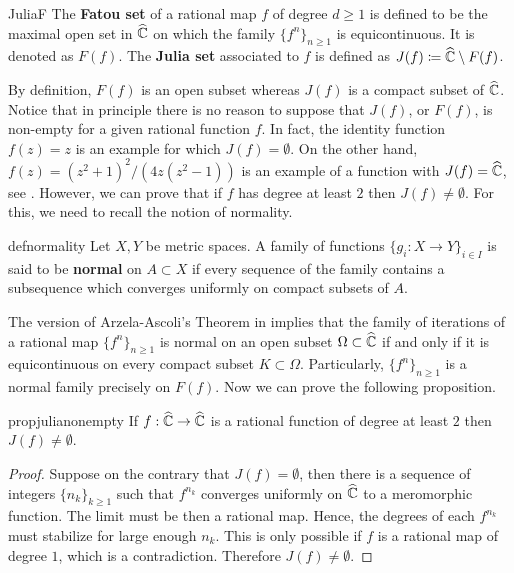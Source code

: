 \begin{mydef}{}{JuliaF}
The {\bf Fatou set} of a rational map $f$ of degree $d\geq 1$ is defined to be the maximal open set in $\widehat{\mathbb{C}}$ on which the family $\{f^n\}_{n\geq 1}$ is equicontinuous. It is denoted as $F(f)$.  The {\bf Julia set} associated to $f$ is defined as $J(f) \coloneqq \widehat{\mathbb{C}}\setminus F(f)$. 
\end{mydef}

By definition, $F(f)$ is an open subset whereas $J(f)$ is a compact subset of $\widehat{\mathbb{C}}$. Notice that in principle there is no reason to suppose that $J(f)$, or $F(f)$, is non-empty for a given rational  function $f$. In fact, the identity function $f(z)=z$ is an example for which $J(f)=\emptyset$. On the other hand, $f(z) = (z^2+1)^2/(4z(z^2-1))$ is an example of a function with $J(f) = \widehat{\mathbb{C}}$, see \cite[Section 4.3]{beardon}. However, we can prove that if $f$ has degree at least $2$ then $J(f)\neq \emptyset$. For this, we need to recall the notion of normality.

\begin{mydef}{}{defnormality}
Let $X,Y$ be metric spaces. A family of functions $\{g_i:X\to Y \}_{i\in I}$ is said to be {\bf normal} on $A\subset X$ if every sequence of the family contains a subsequence which converges uniformly on compact subsets of $A$.
\end{mydef}

The version of Arzela-Ascoli's Theorem in \cite[Theorem 14, Section 5.3]{ahlfors} implies that the family of iterations of a rational map $\{f^n\}_{n\geq 1}$ is normal on an open subset $\Omega\subset \widehat{\mathbb{C}}$ if and only if it is equicontinuous on every compact subset $K\subset \Omega$. Particularly, $\{f^n\}_{n\geq 1}$ is a normal family precisely on $F(f)$. Now we can prove the following proposition.

\begin{myprop}{}{propjulianonempty}
If $f:\widehat{\mathbb{C}} \rightarrow \widehat{\mathbb{C}}$ is a rational function of degree at least $2$ then $J(f) \neq \emptyset$.
\end{myprop}

\begin{proof}
Suppose on the contrary that $J(f)=\emptyset$, then there is a sequence of integers $\{n_k\}_{k\geq 1}$ such that $f^{n_k}$ converges uniformly on $\widehat{\mathbb{C}}$ to a meromorphic function. The limit must be then a rational map. Hence, the degrees of each $f^{n_k}$ must stabilize for large enough $n_k$. This is only possible if $f$ is a rational map of degree $1$, which is a contradiction. Therefore $J(f)\neq \emptyset$.
\end{proof} 

